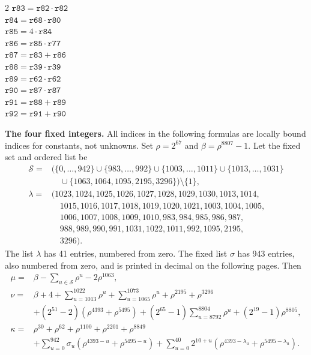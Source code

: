 \documentclass[10pt]{article}
\begin{document}
\begin{multicols}{2}
\(\mathtt{r83} = \mathtt{r82} \cdot \mathtt{r82}\)\\
\(\mathtt{r84} = \mathtt{r68} \cdot \mathtt{r80}\)\\
\(\mathtt{r85} = 4 \cdot \mathtt{r84}\)\\
\(\mathtt{r86} = \mathtt{r85} \cdot \mathtt{r77}\)\\
\(\mathtt{r87} = \mathtt{r83} + \mathtt{r86}\)\\
\(\mathtt{r88} = \mathtt{r39} \cdot \mathtt{r39}\)\\
\(\mathtt{r89} = \mathtt{r62} \cdot \mathtt{r62}\)\\
\(\mathtt{r90} = \mathtt{r87} \cdot \mathtt{r87}\)\\
\(\mathtt{r91} = \mathtt{r88} + \mathtt{r89}\)\\
\(\mathtt{r92} = \mathtt{r91} + \mathtt{r90}\)\\
\end{multicols}
\clearpage
\textbf{The four fixed integers.} All indices in the following formulas are
locally bound indices for constants, not unknowns. Set \(\rho=2^{67}\) and
\(\beta=\rho^{8807}-1\). Let the fixed set and ordered list be
\[
\begin{aligned}
\mathcal S={}&\bigl(\{0,\ldots,942\}\cup\{983,\ldots,992\}\cup
\{1003,\ldots,1011\}\cup\{1013,\ldots,1031\}\\
&\quad\cup\{1063,1064,1095,2195,3296\}\bigr)\setminus\{1\},\\
\lambda={}&(1023,1024,1025,1026,1027,1028,1029,1030,1013,1014,\\
&\quad 1015,1016,1017,1018,1019,1020,1021,1003,1004,1005,\\
&\quad 1006,1007,1008,1009,1010,983,984,985,986,987,\\
&\quad 988,989,990,991,1031,1022,1011,992,1095,2195,\\
&\quad 3296).
\end{aligned}
\]
The list \(\lambda\) has 41 entries, numbered from zero. The fixed list
\(\sigma\) has 943 entries, also numbered from zero, and is printed in
decimal on the following pages. Then
\[
\begin{aligned}
\mu={}&\beta-\sum_{u\in\mathcal S}\rho^u-2\rho^{1063},\\
\nu={}&\beta+4+\sum_{u=1013}^{1022}\rho^u+\sum_{u=1065}^{1073}\rho^u
 +\rho^{2195}+\rho^{3296}\\
&+(2^{51}-2)(\rho^{4393}+\rho^{5495})
 +(2^{65}-1)\sum_{u=8792}^{8804}\rho^u+(2^{19}-1)\rho^{8805},\\
\kappa={}&\rho^{30}+\rho^{62}+\rho^{1100}+\rho^{2201}+\rho^{8849}\\
&+\sum_{u=0}^{942}\sigma_u(\rho^{4393-u}+\rho^{5495-u})
 +\sum_{u=0}^{40}2^{10+u}(\rho^{4393-\lambda_u}+\rho^{5495-\lambda_u}).
\end{aligned}
\]
\end{document}
